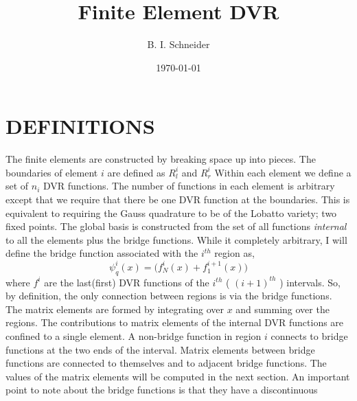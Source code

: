 
\def \<{\langle}

\def \>{\rangle}



\title{Finite Element DVR}
\author{B. I. Schneider}

\address{ Physics Division, National Science Foundation, Arlington,
Virginia 22230 and Electron and Optical Physics Division, National
Institute of Standards and Technology, Gaithersburg, MD 20899}

\date{\today}

\maketitle

%


\section{DEFINITIONS}
The finite elements are constructed by breaking space up into pieces.  The
boundaries of element $i$ are defined as $R^{i}_{l}$ and $R^{i}_{r}$  Within each
element we define a set of $n_{i}$ DVR functions.  The number of functions in each
element is arbitrary except that we require that there be one DVR function at the
boundaries.  This is equivalent to requiring the Gauss quadrature to be of the
Lobatto variety; two fixed points.  The global basis is constructed from the 
set of all functions {\em internal } to all the elements plus the bridge functions.  While it completely arbitrary, I will define the bridge function 
associated with the $i^{th}$ region as,
\begin{equation}
  \psi^{i}_{q}(x)  = \big ( f^{i}_{N}(x) + f^{i+1}_{1}(x) \big ) 
\end{equation}
where $f^{i}$ are the last(first) DVR functions of the $i^{th}$ ( $(i+1)^{th}$ )
intervals.  So, by definition, the only connection between regions is via the
bridge functions.  The matrix elements are formed by integrating over $x$ and summing
over the regions.  The contributions to matrix elements of the internal DVR 
functions are confined to a single element.  A non-bridge function in region $i$
connects to bridge functions at the two ends of the interval.  Matrix elements between
bridge functions are connected to themselves and to adjacent bridge functions.  The
values of the matrix elements will be computed in the next section.  An important
point to note about the bridge functions is that they have a discontinuous

